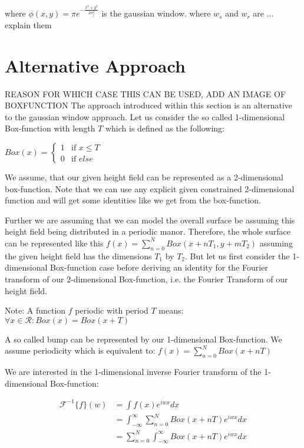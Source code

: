 where $\phi(x,y) = \pi e^{-\frac{x^2 + y^2}{2\sigma_{f}^2}}$ is the gaussian window.
where $w_s$ and $w_r$ are ... explain them

\section{Alternative Approach}
\label{sec:pq}
REASON FOR WHICH CASE THIS CAN BE USED, ADD AN IMAGE OF BOXFUNCTION
The approach introduced within this section is an alternative to the gaussian window approach.
Let us consider the so called 1-dimensional Box-function with length $T$ which is defined as the following: 

$
Box(x) =
\left\{
	\begin{array}{ll}
		1  & \mbox{if } x \leq T \\
		0 & \mbox{if } else
	\end{array}
\right.
$

We assume, that our given height field can be represented as a 2-dimensional box-function. 
Note that we can use any explicit given constrained 2-dimensional function and will get some identities like
we get from the box-function.
 
Further we are assuming that we can model the overall surface be assuming this height field being distributed in a periodic manor.
Therefore, the whole surface can be represented like this $f(x) = \sum_{n=0}^{N} Box(x+nT_1, y+mT_2)$ assuming the given height field has the dimensions $T_1$ by $T_2$. But let us first consider the 1-dimensional Box-function case before deriving an identity for the Fourier transform of our 2-dimensional Box-function, i.e. the Fourier Transform of our height field. 

Note: A function $f$ periodic with period $T$ means: $\forall x \in \mathcal{R}: Box(x) = Box(x+T)$

A so called bump can be represented by our 1-dimensional Box-function. We assume periodicity which is equivalent to:   
$f(x) = \sum_{n=0}^{N} Box(x+nT)$

We are interested in the 1-dimensional inverse Fourier transform of the 1-dimensional Box-function:

\begin{align*}
\mathcal{F}^{-1}\{f\}(w)
& =\int f(x) e^{iwx}dx\\
& =\int_{-\infty}^{\infty} \sum_{n=0}^{N} Box(x+nT) e^{iwx}dx\\
& =\sum_{n=0}^{N} \int_{-\infty}^{\infty} Box(x+nT) e^{iwx}dx
\end{align*}

